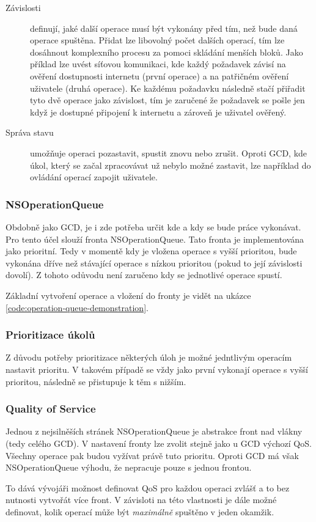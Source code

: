 \begin{description}
  \item[Závislosti] definují, jaké další operace musí být vykonány před tím, než bude daná operace spuštěna.
  Přidat lze libovolný počet dalších operací, tím lze dosáhnout komplexního procesu za pomoci skládání menších bloků.
  Jako příklad lze uvést síťovou komunikaci, kde každý požadavek závisí na ověření dostupnosti internetu (první operace) a na patřičném ověření uživatele (druhá operace).
  Ke každému požadavku následně stačí přiřadit tyto dvě operace jako závislost, tím je zaručené že požadavek se pošle jen když je dostupné připojení k internetu a zároveň je uživatel ověřený.
  \item[Správa stavu] umožňuje operaci pozastavit, spustit znovu nebo zrušit.
  Oproti GCD, kde úkol, který se začal zpracovávat už nebylo možné zastavit, lze například do ovládání operací zapojit uživatele.
\end{description}

\subsubsection*{NSOperationQueue}

Obdobně jako GCD, je i zde potřeba určit kde a kdy se bude práce vykonávat.
Pro tento účel slouží fronta NSOperationQueue.
Tato fronta je implementována jako prioritní.
Tedy v momentě kdy je vložena operace s vyšší prioritou, bude vykonána dříve než stávající operace s nízkou prioritou (pokud to její závislosti dovolí).
Z tohoto odůvodu není zaručeno kdy se jednotlivé operace spustí.

Základní vytvoření operace a vložení do fronty je vidět na ukázce \ref{code:operation-queue-demonstration}.


\subsubsection*{Prioritizace úkolů}

Z důvodu potřeby prioritizace některých úloh je možné jedntlivým operacím nastavit prioritu.
V takovém případě se vždy jako první vykonají operace s vyšší prioritou, následně se přistupuje k těm s nižším.

\subsubsection*{Quality of Service}

Jednou z nejsilněších stránek NSOperationQueue je abstrakce front nad vlákny (tedy celého GCD).
V nastavení fronty lze zvolit stejně jako u GCD výchozí QoS.
Všechny operace pak budou vyžívat právě tuto prioritu.
Oproti GCD má však NSOperationQueue výhodu, že nepracuje pouze s jednou frontou.

To dává vývojáři možnost definovat QoS pro každou operaci zvlášť a to bez nutnosti vytvořát více front.
V závisloti na této vlastnosti je dále možné definovat, kolik operací může být \textit{maximálně} spuštěno v jeden okamžik.
